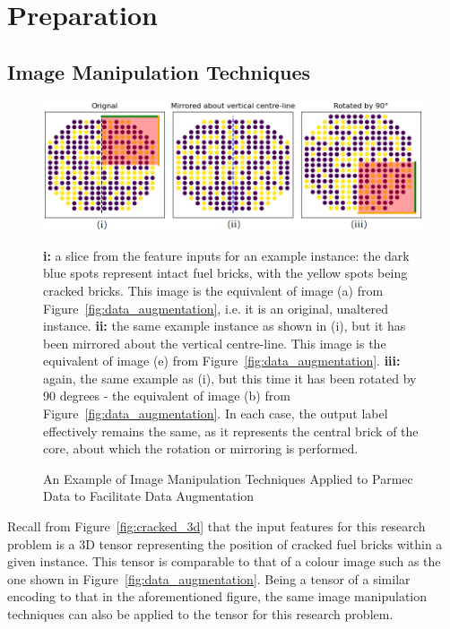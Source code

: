 \section{Preparation} \label{data}

\subsection{Image Manipulation Techniques} \label{manipulation}

\begin{figure}[h]
	\centering
	\includegraphics[scale=0.5]{Figures/parmec_augmentation.png}
	\caption{An Example of Image Manipulation Techniques Applied to Parmec Data to Facilitate Data Augmentation} {\textbf{i:} a slice from the feature inputs for an example instance: the dark blue spots represent intact fuel bricks, with the yellow spots being cracked bricks. This image is the equivalent of image (a) from Figure~\ref{fig:data_augmentation}, i.e. it is an original, unaltered instance. \textbf{ii:} the same example instance as shown in (i), but it has been mirrored about the vertical centre-line. This image is the equivalent of image (e) from Figure~\ref{fig:data_augmentation}. \textbf{iii:} again, the same example as (i), but this time it has been rotated by 90 degrees - the equivalent of image (b) from Figure~\ref{fig:data_augmentation}. In each case, the output label effectively remains the same, as it represents the central brick of the core, about which the rotation or mirroring is performed.}
	\label{fig:parmec_augmentation}
\end{figure}

Recall from Figure~\ref{fig:cracked_3d} that the input features for this research problem is a 3D tensor representing the position of cracked fuel bricks within a given instance. This tensor is comparable to that of a colour image such as the one shown in Figure~\ref{fig:data_augmentation}. Being a tensor of a similar encoding to that in the aforementioned figure, the same image manipulation techniques can also be applied to the tensor for this research problem.
\\

